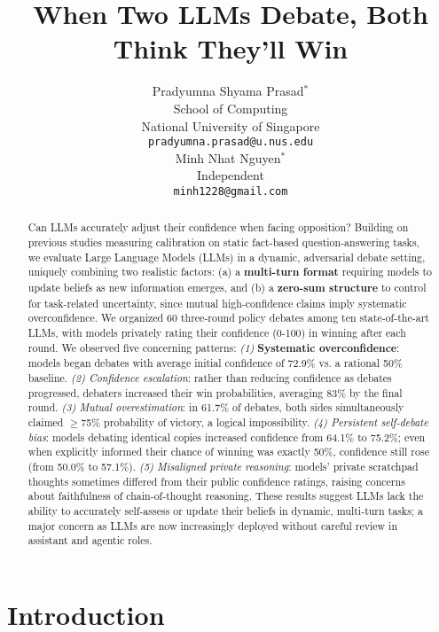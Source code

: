 \documentclass{article}
\title{When Two LLMs Debate, Both Think They'll Win}
\author{%
Pradyumna Shyama Prasad$^{*}$ \\ %
  School of Computing \\ %
  National University of Singapore \\ %
  \texttt{pradyumna.prasad@u.nus.edu} \\ %
  \And
  Minh Nhat Nguyen$^{*}$ \\
  Independent \\
  \texttt{minh1228@gmail.com} \\
}
\begin{document}
\maketitle



\begin{abstract}
  Can LLMs accurately adjust their confidence when facing opposition? Building on previous studies measuring calibration on static fact-based question-answering tasks, we evaluate Large Language Models (LLMs) in a dynamic, adversarial debate setting, uniquely combining two realistic factors: (a) a \textbf{multi-turn format} requiring models to update beliefs as new information emerges, and (b) a \textbf{zero-sum structure} to control for task-related uncertainty, since mutual high-confidence claims imply systematic overconfidence. We organized 60 three-round policy debates among ten state-of-the-art LLMs, with models privately rating their confidence (0-100) in winning after each round. We observed five concerning patterns: \textit{(1)} \textbf{Systematic overconfidence}: models began debates with average initial confidence of 72.9\% vs. a rational 50\% baseline. \textit{(2) Confidence escalation}: rather than reducing confidence as debates progressed, debaters increased their win probabilities, averaging 83\% by the final round. \textit{(3) Mutual overestimation}: in 61.7\% of debates, both sides simultaneously claimed $\geq$75\% probability of victory, a logical impossibility. \textit{(4) Persistent self-debate bias}: models debating identical copies increased confidence from 64.1\% to 75.2\%; even when explicitly informed their chance of winning was exactly 50\%, confidence still rose (from 50.0\% to 57.1\%). \textit{(5) Misaligned private reasoning}: models' private scratchpad thoughts sometimes differed from their public confidence ratings, raising concerns about faithfulness of chain-of-thought reasoning. These results suggest LLMs lack the ability to accurately self-assess or update their beliefs in dynamic, multi-turn tasks; a major concern as LLMs are now increasingly deployed without careful review in assistant and agentic roles.
  \end{abstract}


\section{Introduction}
\end{document}

